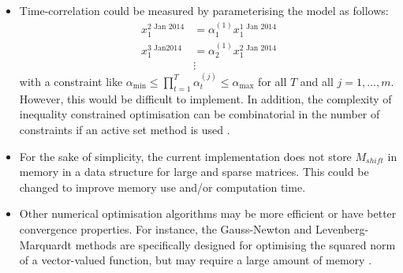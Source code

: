\documentclass{article}
\begin{document}
\begin{itemize}
    \item Time-correlation could be measured by parameterising the model as follows: 
    \begin{align*}
        x_1^{2 \text{ Jan } 2014} &= \alpha_1^{(1)} x_1^{1 \text{ Jan } 2014} \\
        x_1^{3 \text{ Jan} 2014} &= \alpha_2^{(1)} x_1^{2 \text{ Jan } 2014} \\
        &\vdots
    \end{align*}
    with a constraint like $\alpha_{\min} \le \prod_{t=1}^T \alpha_t^{(j)} \le \alpha_{\max}$ for all $T$ and all $j = 1,\dots,m$. However, this would be difficult to implement. In addition, the complexity of inequality constrained optimisation can be combinatorial in the number of constraints if an active set method is used \cite{Nocedal2006}.

    \item For the sake of simplicity, the current implementation does not store $M_{shift}$ in memory in a data structure for large and sparse matrices. This could be changed to improve memory use and/or computation time.
    
    \item Other numerical optimisation algorithms may be more efficient or have better convergence properties. For instance, the Gauss-Newton and Levenberg-Marquardt methods are specifically designed for optimising the squared norm of a vector-valued function, but may require a large amount of memory \cite[Section 10.3]{Nocedal2006}.
    
\end{itemize}

\printbibliography
\end{document}
